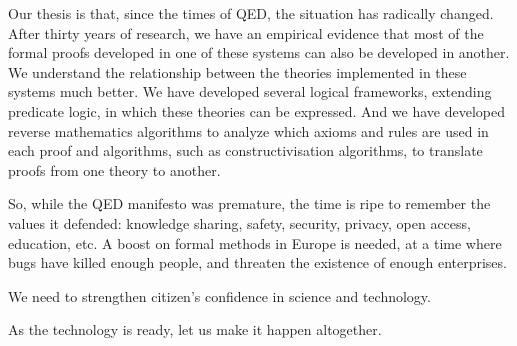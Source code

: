 Our thesis is that, since the times of QED, the situation has radically
changed. After thirty years of research, we have an empirical evidence
that most of the formal proofs developed in one of these systems can
also be developed in another. We understand the relationship between
the theories implemented in these systems much better. We have
developed several logical frameworks, extending predicate logic, in
which these theories can be expressed. And we have developed reverse
mathematics algorithms to analyze which axioms and rules are used in
each proof and algorithms, such as constructivisation algorithms, to
translate proofs from one theory to another.

So, while the QED manifesto was premature, the time is ripe to
remember the values it defended: knowledge sharing, safety, security,
privacy, open access, education, etc. A boost on formal methods in
Europe is needed, at a time where bugs have killed enough people, and
threaten the existence of enough enterprises.

We need to strengthen citizen's confidence in science and technology.

As the technology is ready, let us make it happen altogether.

